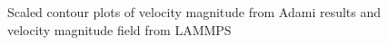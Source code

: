 \begin{figure}[H]
\centering
  \begin{footnotesize}
  
  \caption[Scaled contour plots of velocity magnitude from Adami results and velocity magnitude field from LAMMPS]{Scaled contour plots of velocity magnitude from Adami results and velocity magnitude field from LAMMPS}
  \label{fig:Bild3.14}
  \end{footnotesize}
\end{figure} 



